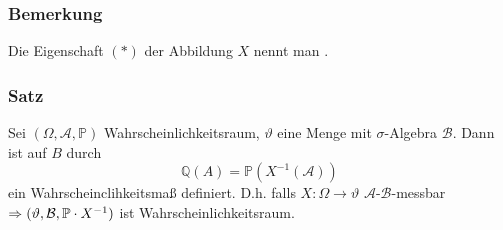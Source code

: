 \subsubsection{Bemerkung}
Die Eigenschaft $(*)$ der Abbildung $X$ nennt man .
\subsubsection{Satz}
Sei $(\Omega,\mathcal{A},\mathbb{P})$ Wahrscheinlichkeitsraum, $\vartheta$ eine Menge mit $\sigma$-Algebra $\mathcal{B}$. Dann ist auf $B$ durch
\[\mathbb{Q}(A)=\mathbb{P}(X^{-1}(\mathcal{A}))\]
ein Wahrscheinclihkeitsma\ss{} definiert. D.h. falls $X\colon\Omega\to\vartheta$ $\mathcal{A}$-$\mathcal{B}$-messbar $\Rightarrow(\vartheta,\mathcal{B},\mathbb{P}\cdot X^{-1})$ ist Wahrscheinlichkeitsraum.

